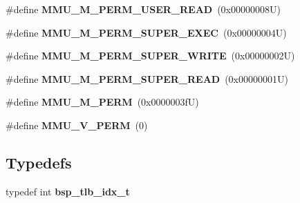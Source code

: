 \begin{DoxyCompactItemize}
\#define {\bfseries M\+M\+U\+\_\+\+M\+\_\+\+P\+E\+R\+M\+\_\+\+U\+S\+E\+R\+\_\+\+R\+E\+AD}~(0x00000008\+U)
\item 
\mbox{\label{group__Virtex5MMU_ga11a445ec489cb49974b8c3c09bc5f4cd}} 
\#define {\bfseries M\+M\+U\+\_\+\+M\+\_\+\+P\+E\+R\+M\+\_\+\+S\+U\+P\+E\+R\+\_\+\+E\+X\+EC}~(0x00000004\+U)
\item 
\mbox{\label{group__Virtex5MMU_ga929e118df320b23a723df58eee801753}} 
\#define {\bfseries M\+M\+U\+\_\+\+M\+\_\+\+P\+E\+R\+M\+\_\+\+S\+U\+P\+E\+R\+\_\+\+W\+R\+I\+TE}~(0x00000002\+U)
\item 
\mbox{\label{group__Virtex5MMU_ga1326d65032d4ecb8ce228960c5c9b1b8}} 
\#define {\bfseries M\+M\+U\+\_\+\+M\+\_\+\+P\+E\+R\+M\+\_\+\+S\+U\+P\+E\+R\+\_\+\+R\+E\+AD}~(0x00000001\+U)
\item 
\mbox{\label{group__Virtex5MMU_ga712babb973a3cad185a6bfcbd33e38ab}} 
\#define {\bfseries M\+M\+U\+\_\+\+M\+\_\+\+P\+E\+RM}~(0x0000003f\+U)
\item 
\mbox{\label{group__Virtex5MMU_gad562e59203e348d1ab694633b5501b41}} 
\#define {\bfseries M\+M\+U\+\_\+\+V\+\_\+\+P\+E\+RM}~(0)
\end{DoxyCompactItemize}
\subsection*{Typedefs}
\begin{DoxyCompactItemize}
\item 
\mbox{\label{group__Virtex5MMU_ga006c180c0373720f8b4891b3759ade1f}} 
typedef int {\bfseries bsp\+\_\+tlb\+\_\+idx\+\_\+t}
\end{DoxyCompactItemize}
